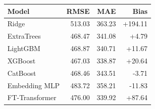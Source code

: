 \begin{tabular}{lrrr}
\toprule
Model & RMSE & MAE & Bias \\
\midrule
Ridge & 513.03 & 363.23 & +194.11 \\
ExtraTrees & 468.47 & 341.08 & +4.79 \\
LightGBM & 468.87 & 340.71 & +11.67 \\
XGBoost & 467.03 & 338.87 & +20.64 \\
CatBoost & 468.46 & 343.51 & -3.71 \\
Embedding MLP & 483.72 & 358.21 & -11.83 \\
FT-Transformer & 476.00 & 339.92 & +87.64 \\
\bottomrule
\end{tabular}
